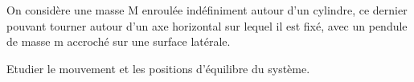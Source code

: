 \noindent On considère une masse M enroulée indéfiniment autour d'un cylindre, ce dernier pouvant tourner
autour d'un axe horizontal sur lequel il est fixé, avec un pendule de masse m accroché sur une surface latérale.

\vspace{5pt}
\noindent Etudier le mouvement et les positions d'équilibre du système.

\subetoiles